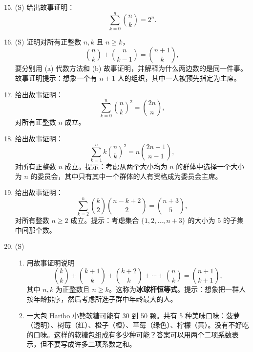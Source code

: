 \documentclass[UTF8, 12pt, fontset=fandol, oneside]{ctexart}
\begin{document}
\begin{enumerate}
  \setcounter{enumi}{14}
  \item (S) 给出故事证明：
  \[
    \sum_{k=0}^{n}\binom nk=2^n.
  \]

  \item (S) 证明对所有正整数 $n,k$ 且 $n\ge k$，
  \[
    \binom nk+\binom n{k-1}=\binom{n+1}{k},
  \]
  要分别用 (a) 代数方法和 (b) 故事证明，并解释为什么两边数的是同一件事。故事证明提示：想象一个有 $n+1$ 人的组织，其中一人被预先指定为主席。

  \item 给出故事证明：
  \[
    \sum_{k=0}^{n}\binom nk^2=\binom{2n}{n},
  \]
  对所有正整数 $n$ 成立。

  \item 给出故事证明：
  \[
    \sum_{k=1}^{n} k\binom nk^2
    =n\binom{2n-1}{n-1},
  \]
  对所有正整数 $n$ 成立。提示：考虑从两个大小均为 $n$ 的群体中选择一个大小为 $n$ 的委员会，其中只有其中一个群体的人有资格成为委员会主席。

  \item 给出故事证明：
  \[
    \sum_{k=2}^{n}\binom k2\binom{n-k+2}{2}
    =\binom{n+3}{5},
  \]
  对所有整数 $n\ge2$ 成立。提示：考虑集合 $\{1,2,\ldots,n+3\}$ 的大小为 5 的子集中间那个数。

  \item (S)
  \begin{enumerate}
    \item 用故事证明说明
    \[
      \binom kk+\binom{k+1}{k}+\binom{k+2}{k}+\cdots+\binom nk
      =\binom{n+1}{k+1},
    \]
    其中 $n,k$ 为正整数且 $n\ge k$。这称为\textbf{冰球杆恒等式}。提示：想象把一群人按年龄排序，然后考虑所选子群中年龄最大的人。
    \item 一大包 Haribo 小熊软糖可能有 30 到 50 颗。共有 5 种美味口味：菠萝（透明）、树莓（红）、橙子（橙）、草莓（绿色）、柠檬（黄）。没有不好吃的口味。这样的软糖包组成有多少种可能？答案可以用两个二项系数表示，但不要写成许多二项系数之和。
  \end{enumerate}


\end{enumerate}
\end{document}
